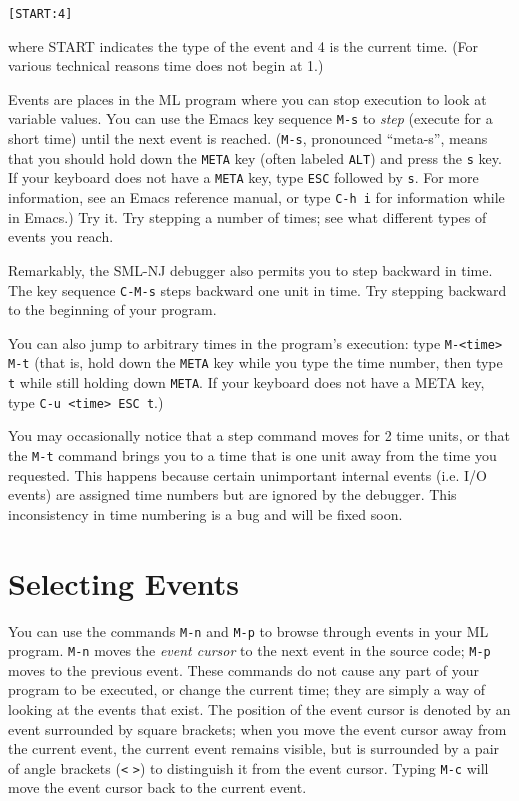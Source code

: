 \begin{verbatim}
[START:4]
\end{verbatim}
where START indicates the type of the event and 4 is the current
time.  (For various technical reasons time does not begin at 1.)

Events are places in the ML program where you can stop execution to
look at variable values.  You can use the Emacs key sequence \verb'M-s' to
{\em step} (execute for a short time) until the next event is reached.
(\verb'M-s', pronounced ``meta-s'', means that you should hold down
the \verb'META' key (often labeled \verb'ALT') and press the \verb's'
key.  If your keyboard does not have a \verb'META' key,
type \verb'ESC' followed by \verb's'.  For more information, see an
Emacs reference manual, or type \verb'C-h i' for information while in Emacs.)
Try it.  Try stepping a number of times; see what different types of
events you reach.

Remarkably, the SML-NJ debugger also permits you to step {\em}
backward in time.  The key sequence \verb'C-M-s' steps backward one unit in
time.  Try stepping backward to the beginning of your program.

You can also jump to arbitrary times in the program's execution: type
\verb'M-<time> M-t' (that is,
hold down the \verb'META' key while you type the time number,
then type \verb't' while still holding down \verb'META'.  If your
keyboard does not have a META key, type \verb'C-u <time> ESC t'.)

You may occasionally notice that a step command moves for 2 time
units, or that the \verb'M-t' command brings you to a time that is one
unit away from the time you requested.  This happens because certain
unimportant internal events (i.e. I/O events) are assigned time
numbers but are ignored by the debugger.  This inconsistency in time
numbering is a bug and will be fixed soon.

\section{Selecting Events}

You can use the commands \verb'M-n' and \verb'M-p'
to browse through events in your ML
program.  \verb'M-n' moves the {\em event cursor} to the next event in the
source code; \verb'M-p' moves to the previous event.  These commands do not
cause any part of your program to be executed, or change the current
time; they are simply a way of looking at the events that exist.  The
position of the event cursor is denoted by an event surrounded by
square brackets; when you move the event cursor away from the current
event, the current event remains visible, but is surrounded by a pair
of angle brackets (\verb'<' \verb'>') to distinguish it from the event
cursor.  Typing \verb'M-c' will move the event cursor back to the
current event.


